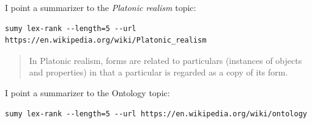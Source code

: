 I point a summarizer to the \emph{Platonic realism} topic:

\begin{lstlisting}
sumy lex-rank --length=5 --url https://en.wikipedia.org/wiki/Platonic_realism
\end{lstlisting}

\begin{quote}
In Platonic realism, forms are related to particulars (instances of objects and properties) in that a particular is regarded as a copy of its form.
\end{quote}
I point a summarizer to the Ontology topic:

\begin{lstlisting}
sumy lex-rank --length=5 --url https://en.wikipedia.org/wiki/ontology
\end{lstlisting}

